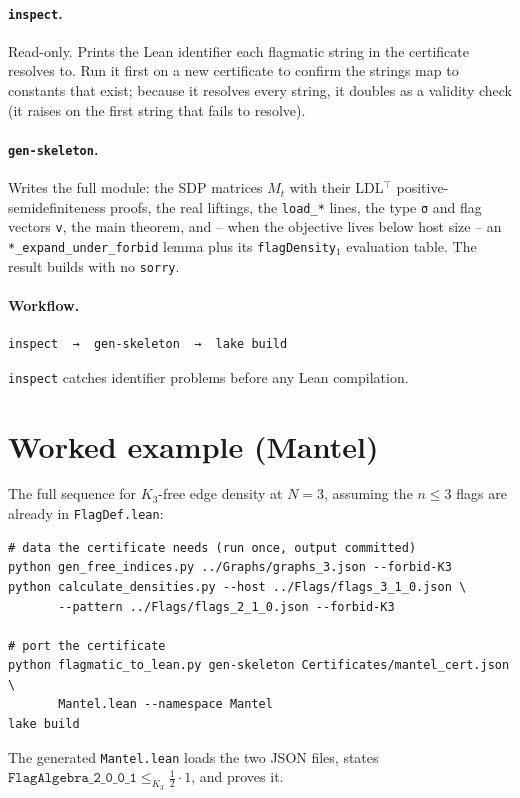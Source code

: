 \documentclass[11pt]{article}
\begin{document}
\paragraph{\texttt{inspect}.} Read-only. Prints the Lean identifier each
flagmatic string in the certificate resolves to. Run it first on a new
certificate to confirm the strings map to constants that exist; because it
resolves every string, it doubles as a validity check (it raises on the
first string that fails to resolve).

\paragraph{\texttt{gen-skeleton}.} Writes the full module: the SDP matrices
$M_t$ with their LDL$^\top$ positive-semidefiniteness proofs, the real
liftings, the \texttt{load\_*} lines, the type \texttt{σ} and flag vectors
\texttt{v}, the main theorem, and -- when the objective lives below host
size -- an \texttt{*\_expand\_under\_forbid} lemma plus its
\texttt{flagDensity}$_1$ evaluation table. The result builds with no
\texttt{sorry}.

\paragraph{Workflow.}
\begin{lstlisting}[language={}]
inspect  →  gen-skeleton  →  lake build
\end{lstlisting}
\texttt{inspect} catches identifier problems before any Lean compilation.

\section{Worked example (Mantel)}

The full sequence for $K_3$-free edge density at $N=3$, assuming the
$n\le 3$ flags are already in \texttt{FlagDef.lean}:
\begin{lstlisting}[language={}]
# data the certificate needs (run once, output committed)
python gen_free_indices.py ../Graphs/graphs_3.json --forbid-K3
python calculate_densities.py --host ../Flags/flags_3_1_0.json \
       --pattern ../Flags/flags_2_1_0.json --forbid-K3

# port the certificate
python flagmatic_to_lean.py gen-skeleton Certificates/mantel_cert.json \
       Mantel.lean --namespace Mantel
lake build
\end{lstlisting}
The generated \texttt{Mantel.lean} loads the two JSON files, states
$\texttt{FlagAlgebra\_2\_0\_0\_1} \le_{K_3} \tfrac12\cdot 1$, and proves it.
\end{document}
